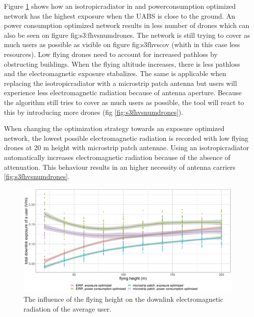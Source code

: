 Figure \ref{fig:s3fhvsdl} shows how an \gls{isotropicradiator} in and powerconsumption optimized network has the highest exposure when 
the \gls{UABS}  is close to the ground. An power consumption optimized network results in less number of drones which can also be seen 
on figure \gls{fig:s3:fhvsnumdrones}. The network is still trying to cover as much users as possible as visible on figure 
\gls{fig:s3fhvscov} (whith in this case less resources). Low flying drones need to account for increased pathloss by obstructing buildings.
When the flying altitude increases, there is less pathloss and the electromagnetic exposure stabalizes. The same is applicable when replacing
the \gls{isotropicradiator} with a microstrip patch antenna but users will experience less electromagnetic radiation 
because of antenna aperture. Because the algorithm still tries to cover as much users as possible, the tool will react to this by 
introducing more drones (fig \ref{fig:s3fhvsnumdrones}).

When changing the optimization strategy towards an exposure optimized network, the lowest possible electromagnetic radiation is recorded
with low flying drones at 20 m height with microstrip patch antennae. Using an \gls{isotropicradiator} automatically increases electromagnetic 
radiation because of the absence of attenuation. This behaviour results in an higher necessity of antenna carriers \ref{fig:s3fhvsnumdrones}.


\begin{figure}[h!]
  \includegraphics[width=\textwidth]{../results/s3/fhvsdl.png}
  \caption{The influence of the flying height on the downlink electromagnetic radiation of the average user.}
  \label{fig:s3fhvsdl}
\end{figure}

